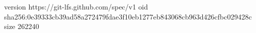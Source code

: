 version https://git-lfs.github.com/spec/v1
oid sha256:0e39333cb39ad58a272479fdae3f10eb1277eb843068cb963d426cfbc029428c
size 262240
